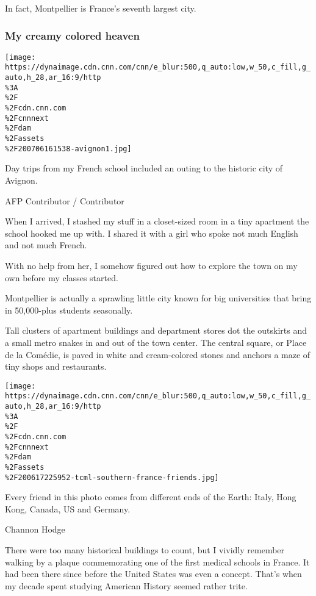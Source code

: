 In fact, Montpellier is France's seventh largest city.

\hypertarget{my-creamy-colored-heaven}{%
\subsubsection{My creamy colored
heaven}\label{my-creamy-colored-heaven}}

\href{/travel/article/trip-changed-my-life-southern-france/index.html?gallery=5}{}

\texttt{[image: https://dynaimage.cdn.cnn.com/cnn/e\_blur:500,q\_auto:low,w\_50,c\_fill,g\_auto,h\_28,ar\_16:9/http\\\%3A\\\%2F\\\%2Fcdn.cnn.com\\\%2Fcnnnext\\\%2Fdam\\\%2Fassets\\\%2F200706161538-avignon1.jpg]}

Day trips from my French school included an outing to the historic city
of Avignon.

AFP Contributor / Contributor

When I arrived, I stashed my stuff in a closet-sized room in a tiny
apartment the school hooked me up with. I shared it with a girl who
spoke not much English and not much French.

With no help from her, I somehow figured out how to explore the town on
my own before my classes started.

Montpellier is actually a sprawling little city known for big
universities that bring in 50,000-plus students seasonally.

Tall clusters of apartment buildings and department stores dot the
outskirts and a small metro snakes in and out of the town center. The
central square, or Place de la Comédie, is paved in white and
cream-colored stones and anchors a maze of tiny shops and restaurants.

\texttt{[image: https://dynaimage.cdn.cnn.com/cnn/e\_blur:500,q\_auto:low,w\_50,c\_fill,g\_auto,h\_28,ar\_16:9/http\\\%3A\\\%2F\\\%2Fcdn.cnn.com\\\%2Fcnnnext\\\%2Fdam\\\%2Fassets\\\%2F200617225952-tcml-southern-france-friends.jpg]}

Every friend in this photo comes from different ends of the Earth:
Italy, Hong Kong, Canada, US and Germany.

Channon Hodge

There were too many historical buildings to count, but I vividly
remember walking by a plaque commemorating one of the first medical
schools in France. It had been there since before the United States was
even a concept. That's when my decade spent studying American History
seemed rather trite.

